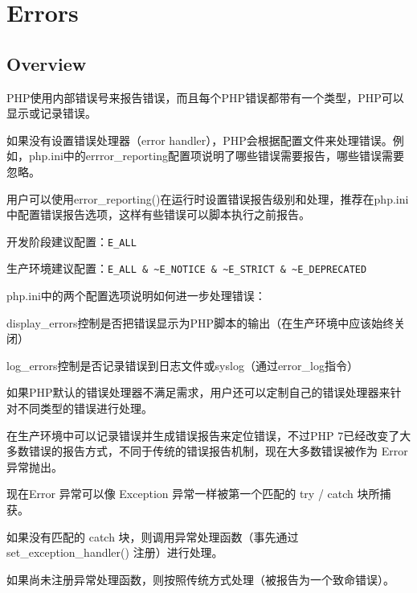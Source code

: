 \part{Errors}


\chapter{Overview}

PHP使用内部错误号来报告错误，而且每个PHP错误都带有一个类型，PHP可以显示或记录错误。

如果没有设置错误处理器（error handler），PHP会根据配置文件来处理错误。例如，php.ini中的errror\_reporting配置项说明了哪些错误需要报告，哪些错误需要忽略。

用户可以使用error\_reporting()在运行时设置错误报告级别和处理，推荐在php.ini中配置错误报告选项，这样有些错误可以脚本执行之前报告。

\begin{compactitem}
\item 开发阶段建议配置：\texttt{E\_ALL}
\item 生产环境建议配置：\texttt{E\_ALL \& \~{}E\_NOTICE \& \~{}E\_STRICT \& \~{}E\_DEPRECATED}
\end{compactitem}

php.ini中的两个配置选项说明如何进一步处理错误：

\begin{compactitem}
\item display\_errors控制是否把错误显示为PHP脚本的输出（在生产环境中应该始终关闭）

\item log\_errors控制是否记录错误到日志文件或syslog（通过error\_log指令）
\end{compactitem}

如果PHP默认的错误处理器不满足需求，用户还可以定制自己的错误处理器来针对不同类型的错误进行处理。 

在生产环境中可以记录错误并生成错误报告来定位错误，不过PHP 7已经改变了大多数错误的报告方式，不同于传统的错误报告机制，现在大多数错误被作为 Error 异常抛出。

现在Error 异常可以像 Exception 异常一样被第一个匹配的 try / catch 块所捕获。

\begin{compactitem}
\item 如果没有匹配的 catch 块，则调用异常处理函数（事先通过 set\_exception\_handler() 注册）进行处理。 
\item 如果尚未注册异常处理函数，则按照传统方式处理（被报告为一个致命错误）。
\end{compactitem}


